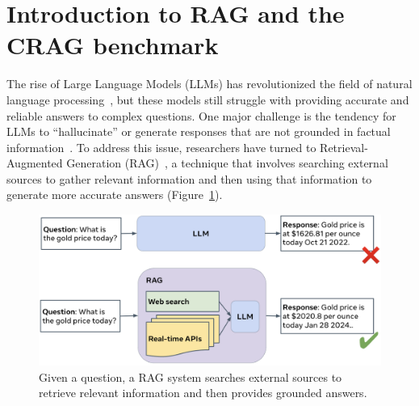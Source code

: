 \section{Introduction to RAG and the CRAG benchmark}
\label{sec:intro}
The rise of Large Language Models (LLMs) has revolutionized the field of natural language processing~\cite{yasunaga-etal-2021-qa,liu2023pre,lievin2024can,statsqa}, but these models still struggle with providing accurate and reliable answers to complex questions. One major challenge is the tendency for LLMs to ``hallucinate'' or generate responses that are not grounded in factual information~\cite{rawte2023troubling, 10.1145/3571730,sun2024large,verifai}. To address this issue, researchers have turned to Retrieval-Augmented Generation (RAG)~\cite{gao2024ragsurvey,lewis2021retrievalaugmented,chen2023benchmarking,symphony}, a technique that involves searching external sources to gather relevant information and then using that information to generate more accurate answers (Figure~\ref{fig:rag}).

\begin{figure}[h]
  \centering
  \includegraphics[width=12cm]{submissions/Xiao2024/figs/RAG.png}
  \caption{Given a question, a RAG system searches external sources to retrieve relevant information and then provides grounded answers.}
  \label{fig:rag}
\end{figure}

